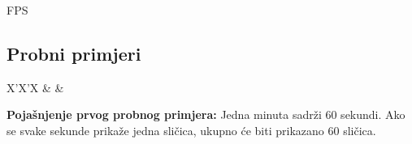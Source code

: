 \begin{statement}[
  problempoints=20,
  timelimit=1 sekunda,
  memorylimit=512 MiB,
]{FPS}

\subsection*{Probni primjeri}
\begin{tabularx}{\textwidth}{X'X'X}
 &
 &
\end{tabularx}

\textbf{Pojašnjenje prvog probnog primjera:}
Jedna minuta sadrži $60$ sekundi. Ako se svake sekunde prikaže jedna sličica,
ukupno će biti prikazano $60$ sličica.

\end{statement}

